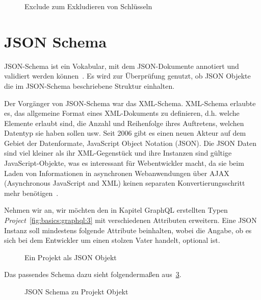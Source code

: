\begin{figure}[h]
    
    \caption{Exclude zum Exkludieren von Schlüsseln}
    \label{fig:basics:typescript:6}
\end{figure}


\section{JSON Schema}
\label{sec:basics:jsonschema}
JSON-Schema ist ein Vokabular, mit dem JSON-Dokumente  annotiert und validiert werden können~\cite{json-schema}.
Es wird zur Überprüfung genutzt, ob JSON Objekte die im JSON-Schema beschriebene Struktur einhalten.

Der Vorgänger von JSON-Schema war das XML-Schema.
XML-Schema erlaubte es, das allgemeine Format eines XML-Dokuments zu definieren,
d.h. welche Elemente erlaubt sind, die Anzahl und Reihenfolge ihres Auftretens, welchen Datentyp sie haben sollen usw.
Seit 2006 gibt es einen neuen Akteur auf dem Gebiet der Datenformate, JavaScript Object Notation (JSON).
Die JSON Daten sind viel kleiner als ihr XML-Gegenstück und ihre Instanzen sind gültige JavaScript-Objekte, was es interessant für Webentwickler macht, da sie beim Laden von
Informationen in asynchronen Webanwendungen über AJAX (Asynchronous JavaScript and XML) keinen separaten Konvertierungsschritt mehr benötigen~\cite{json-schema-xml}.

Nehmen wir an, wir möchten den in Kapitel GraphQL erstellten Typen \emph{Project}~\ref{fig:basics:graphql:3} mit verschiedenen Attributen erweitern.
Eine JSON Instanz soll mindestens folgende Attribute beinhalten, wobei die Angabe, ob es sich bei dem Entwickler
um einen stolzen Vater handelt, optional ist.

\begin{figure}[h]
    
    \caption{Ein Projekt als JSON Objekt}
    \label{fig:basics:jsonschema:1}
\end{figure}

Das passendes Schema dazu sieht folgendermaßen aus~\ref{fig:basics:jsonschema:2}.

\begin{figure}[h]
    
    \caption{JSON Schema zu Projekt Objekt}
    \label{fig:basics:jsonschema:2}
\end{figure}

